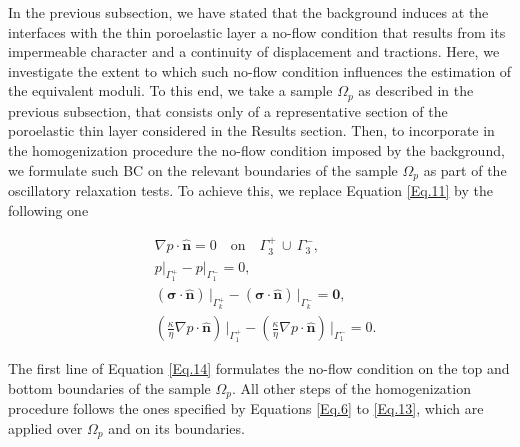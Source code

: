\documentclass[draft]{agujournal2019}
\begin{document}
In the previous subsection, we have stated that the background induces at the interfaces with the thin poroelastic layer a no-flow condition that results from its impermeable character and a continuity of displacement and tractions. Here, we investigate the extent to which such no-flow condition influences the estimation of the equivalent moduli. To this end, we  take a sample $\Omega_p$ as described in the previous subsection, that consists only of a representative section  of the poroelastic thin layer considered in the Results section. Then, to incorporate in the homogenization procedure the no-flow condition imposed by the background, we formulate such BC on the relevant boundaries of the sample $\Omega_p$ as part of the  oscillatory relaxation tests. To achieve this, we replace Equation \ref{Eq.11} by the following one
\begin{linenomath*}
\begin{equation}\label{Eq.14}
\begin{split}
& \nabla p \cdot \bm{\hat n}  = 0 \quad \text{on}\quad \Gamma_3^+ \, \cup \, \Gamma_3^-,\\
& p\vert_{\Gamma_1^+}-p\vert_{\Gamma_1^-} =0, \\
& \left(\bm{\sigma}\cdot \bm{\hat n} \right)\, \vert_{\Gamma_k^+}-\left(\bm{\sigma}\cdot \bm{\hat n} \right)\, \vert_{\Gamma_k^-} = \bm{0},\\
&\left( \frac{\kappa}{\eta} \nabla p \cdot \bm{\hat n} \right) \, \vert_{\Gamma_1^+} -\left( \frac{\kappa}{\eta} \nabla p \cdot \bm{\hat n} \right) \, \vert_{\Gamma_1^-} = 0.
\end{split}
\end{equation}
\end{linenomath*}
The first line of Equation \eqref{Eq.14} formulates the no-flow condition on the top and bottom boundaries of the sample $\Omega_p$. All other steps of the homogenization procedure follows the ones specified by Equations \eqref{Eq.6} to \eqref{Eq.13}, which are applied over $\Omega_p$ and on its boundaries.
\end{document}
